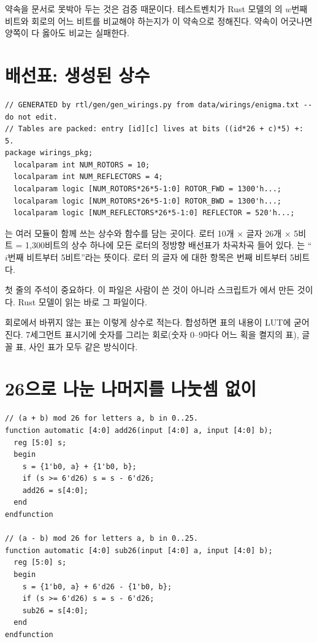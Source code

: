 \Why 약속을 문서로 못박아 두는 것은 검증 때문이다. 테스트벤치가 Rust 모델의 의 $w$번째 비트와
회로의 어느 비트를 비교해야 하는지가 이 약속으로 정해진다. 약속이 어긋나면 양쪽이 다 옳아도 비교는 실패한다.

\section{배선표: 생성된 상수}

\begin{lstlisting}[language=SV,caption={\code{wirings\_pkg.sv}의 머리(상수의 값은 생략).}]
// GENERATED by rtl/gen/gen_wirings.py from data/wirings/enigma.txt -- do not edit.
// Tables are packed: entry [id][c] lives at bits ((id*26 + c)*5) +: 5.
package wirings_pkg;
  localparam int NUM_ROTORS = 10;
  localparam int NUM_REFLECTORS = 4;
  localparam logic [NUM_ROTORS*26*5-1:0] ROTOR_FWD = 1300'h...;
  localparam logic [NUM_ROTORS*26*5-1:0] ROTOR_BWD = 1300'h...;
  localparam logic [NUM_REFLECTORS*26*5-1:0] REFLECTOR = 520'h...;
\end{lstlisting}

는 여러 모듈이 함께 쓰는 상수와 함수를 담는 곳이다. 로터 10개 × 글자 26개 × 5비트 = 1,300비트의
상수 하나에 모든 로터의 정방향 배선표가 차곡차곡 들어 있다. 는 ``$i$번째 비트부터 5비트''라는
뜻이다. 로터 의 글자 에 대한 항목은 번째 비트부터 5비트다.

첫 줄의 주석이 중요하다. 이 파일은 사람이 쓴 것이 아니라 스크립트가 에서
만든 것이다. Rust 모델이 읽는 바로 그 파일이다.

\General 회로에서 바뀌지 않는 표는 이렇게 상수로 적는다. 합성하면 표의 내용이 LUT에 굳어진다. 7세그먼트
표시기에 숫자를 그리는 회로(숫자 0--9마다 어느 획을 켤지의 표), 글꼴 표, 사인 표가 모두 같은 방식이다.

\section{26으로 나눈 나머지를 나눗셈 없이}

\begin{lstlisting}[language=SV,caption={\code{wirings\_pkg.sv}: 26진 덧셈과 뺄셈.},label={lst:add26}]
// (a + b) mod 26 for letters a, b in 0..25.
function automatic [4:0] add26(input [4:0] a, input [4:0] b);
  reg [5:0] s;
  begin
    s = {1'b0, a} + {1'b0, b};
    if (s >= 6'd26) s = s - 6'd26;
    add26 = s[4:0];
  end
endfunction

// (a - b) mod 26 for letters a, b in 0..25.
function automatic [4:0] sub26(input [4:0] a, input [4:0] b);
  reg [5:0] s;
  begin
    s = {1'b0, a} + 6'd26 - {1'b0, b};
    if (s >= 6'd26) s = s - 6'd26;
    sub26 = s[4:0];
  end
endfunction
\end{lstlisting}

